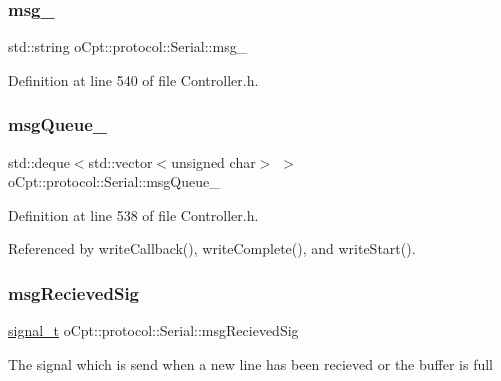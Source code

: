 \subsubsection{\texorpdfstring{msg\+\_\+}{msg\_}}
{\footnotesize\ttfamily std\+::string o\+Cpt\+::protocol\+::\+Serial\+::msg\+\_\+\hspace{0.3cm}{\ttfamily [protected]}}



Definition at line 540 of file Controller.\+h.

\hypertarget{classo_cpt_1_1protocol_1_1_serial_a220138abdeaa8734f9f9b1b1ecd8ccd8}{}\label{classo_cpt_1_1protocol_1_1_serial_a220138abdeaa8734f9f9b1b1ecd8ccd8} 
\subsubsection{\texorpdfstring{msg\+Queue\+\_\+}{msgQueue\_}}
{\footnotesize\ttfamily std\+::deque$<$std\+::vector$<$unsigned char$>$ $>$ o\+Cpt\+::protocol\+::\+Serial\+::msg\+Queue\+\_\+\hspace{0.3cm}{\ttfamily [protected]}}



Definition at line 538 of file Controller.\+h.



Referenced by write\+Callback(), write\+Complete(), and write\+Start().

\hypertarget{classo_cpt_1_1protocol_1_1_serial_ad9abebcea610f6ea0bb9be56b7287a4b}{}\label{classo_cpt_1_1protocol_1_1_serial_ad9abebcea610f6ea0bb9be56b7287a4b} 
\subsubsection{\texorpdfstring{msg\+Recieved\+Sig}{msgRecievedSig}}
{\footnotesize\ttfamily \hyperlink{classo_cpt_1_1protocol_1_1_serial_a53a2b70ff50e141214acfa50bbd232a8}{signal\+\_\+t} o\+Cpt\+::protocol\+::\+Serial\+::msg\+Recieved\+Sig}

The signal which is send when a new line has been recieved or the buffer is full 

